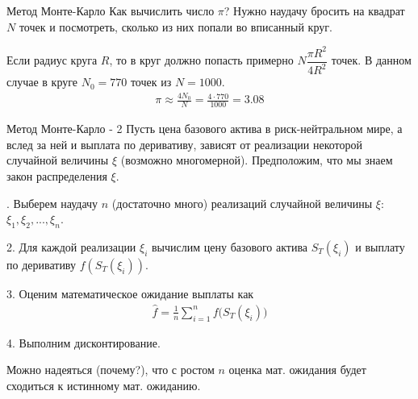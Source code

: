 \documentclass{beamer}
\begin{document}
\begin{frame}{Метод Монте-Карло}
\justify
Как вычислить число $\pi$? Нужно наудачу бросить на квадрат $N$ точек и посмотреть, сколько из них попали во вписанный круг. 

\centering
{}
\justify
Если радиус круга $R$, то в круг должно попасть примерно $N\dfrac{\pi R^2}{4R^2}$ точек. В данном случае в круге $N_0=770$ точек из $N=1000$. 
\begin{align*}
\pi \approx \frac{4N_0}{N} = \frac{4 \cdot 770}{1000} = 3.08
\end{align*}
\end{frame}



\begin{frame}{Метод Монте-Карло - 2}
\justify
Пусть цена базового актива в риск-нейтральном мире, а вслед за ней и выплата по деривативу, зависят от реализации некоторой случайной величины $\xi$ (возможно многомерной). Предположим, что мы знаем закон распределения $\xi$.

. Выберем наудачу $n$ (достаточно много) реализаций случайной величины $\xi$: $\xi_1, \xi_2, ..., \xi_n$.

2. Для каждой реализации $\xi_i$ вычислим цену базового актива $S_T(\xi_i)$ и выплату по деривативу $f(S_T(\xi_i))$.

3. Оценим математическое ожидание выплаты как 
\begin{align*}
\hat{f} = \frac{1}{n}\sum\limits_{i=1}^{n}f\Big(S_T(\xi_i)\Big)
\end{align*}

4. Выполним дисконтирование.

\justify
Можно надеяться (почему?), что с ростом $n$ оценка мат. ожидания будет сходиться к истинному мат. ожиданию.
\end{frame}
\end{document}
